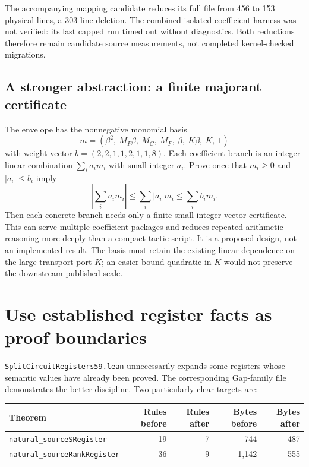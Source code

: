 \documentclass[11pt,letterpaper]{article}
\newcommand{\code}[1]{\nolinkurl{#1}}
\newcommand{\src}[2]{\href{https://github.com/VladimirReshetnikov/ProveIt/blob/60e9c5d620c6c387d932876cfa2d9376f64ea56c/Computability/DiophantineConsistency/Lean/DiophantineConsistency/#1.lean}{\code{#1.lean}}#2}
\begin{document}
The accompanying mapping candidate reduces its full file from 456 to 153
physical lines, a 303-line deletion. The combined isolated coefficient harness
was not verified: its last capped run timed out without diagnostics. Both
reductions therefore remain candidate source measurements, not completed
kernel-checked migrations.

\subsection{A stronger abstraction: a finite majorant certificate}

The envelope has the nonnegative monomial basis
\[
 m=(\beta^2,\ M_F\beta,\ M_C,\ M_F,\ \beta,\ K\beta,\ K,\ 1)
\]
with weight vector $b=(2,2,1,1,2,1,1,8)$. Each coefficient branch is an integer
linear combination $\sum_i a_i m_i$ with small integer $a_i$. Prove once that
$m_i\ge0$ and $|a_i|\le b_i$ imply
\[
 \left|\sum_i a_i m_i\right|\le\sum_i |a_i|m_i
 \le\sum_i b_i m_i.
\]
Then each concrete branch needs only a finite small-integer vector certificate.
This can serve multiple coefficient packages and reduces repeated arithmetic
reasoning more deeply than a compact tactic script. It is a proposed design,
not an implemented result. The basis must retain the existing linear dependence
on the large transport port $K$; an easier bound quadratic in $K$ would not
preserve the downstream published scale.

\section{Use established register facts as proof boundaries}
\label{sec:cuts}

\src{SplitCircuitRegisters59}{ unnecessarily expands some registers whose
semantic values have already been proved.}
The corresponding Gap-family file demonstrates the better discipline. Two
particularly clear targets are:

\begin{center}
\begin{tabular}{lrrrr}
\toprule
Theorem & Rules before & Rules after & Bytes before & Bytes after\\
\midrule
\code{natural_sourceSRegister} & 19 & 7 & 744 & 487\\
\code{natural_sourceRankRegister} & 36 & 9 & 1,142 & 555\\
\bottomrule
\end{tabular}
\end{center}
\end{document}
